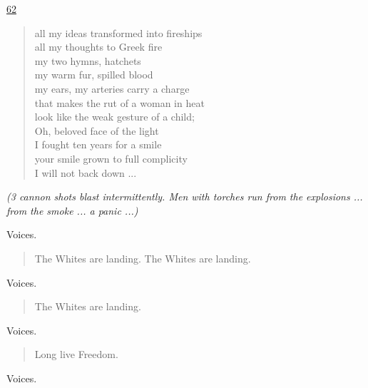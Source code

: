 \documentclass[letterpaper,article,12pt,oneside,notitlepage]{memoir}
\begin{document}
\clearpage

\href{http://cesaire.elotroalex.com/chiens/chiens/p062.html}{62}

\begin{verse}
all my ideas transformed into fireships \\
all my thoughts to Greek fire \\
my two hymns, hatchets \\
my warm fur, spilled blood \\
my ears, my arteries carry a charge \\
that makes the rut of a woman in heat \\
look like the weak gesture of a child; \\
Oh, beloved face of the light \\
I fought ten years for a smile \\
your smile grown to full complicity \\
I will not back down ... \\
\end{verse}

\textit{(3 cannon shots blast intermittently. Men with torches run from the explosions ... from the smoke ... a panic ...)}

\begin{center}Voices.\end{center}

\begin{verse}
\hspace{1cm} The Whites are landing. The Whites are landing. \\
\end{verse}

\begin{center}Voices.\end{center}

\begin{verse}
\hspace{1cm} The Whites are landing. \\
\end{verse}

\begin{center}Voices.\end{center}

\begin{verse}
\hspace{1cm} Long live Freedom. \\
\end{verse}

\begin{center}Voices.\end{center}
\end{document}
